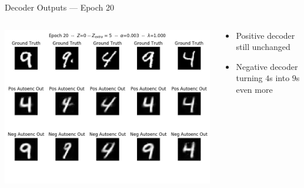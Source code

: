 \documentclass[11pt,dvipsnames,usenames,aspectratio=169]{beamer}  %
\newcommand{\blue}[1]{{\color{Blue} #1}}
\newcommand{\red}[1]{{\color{red} #1}}
\begin{document}
\begin{frame}{Decoder Outputs --- Epoch \red{20}}
  \begin{columns}
    \begin{column}{0.59\textwidth}
      \begin{center}
        \includegraphics[scale=0.44]{deep-pu_epoch=020.jpg}
      \end{center}
    \end{column}
    \begin{column}{0.41\textwidth}
      \begin{itemize}[<+->]
        \setlength{\itemsep}{20pt}
        \item Positive decoder still unchanged
        \item Negative decoder turning \blue{$4$}s into \red{$9$}s even more
      \end{itemize}
    \end{column}
  \end{columns}
\end{frame}
\end{document}
